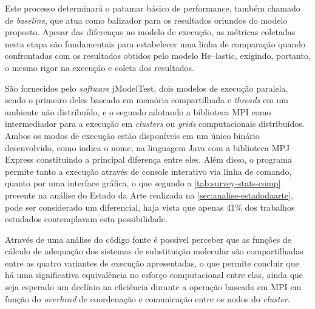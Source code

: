 \documentclass[english,brazilian]{UNISINOSmonografia} %
\begin{document}
Este processo determinará o patamar básico de performance, também chamado de \textit{baseline}, que atua como balizador para os resultados oriundos do modelo proposto.
Apesar das diferenças no modelo de execução, as métricas coletadas nesta etapa são fundamentais para estabelecer uma linha de comparação quando confrontadas com os resultados obtidos pelo modelo \textsf{He}--lastic, exigindo, portanto, o mesmo rigor na execução e coleta dos resultados.


São fornecidos pelo \textit{software} jModelTest, dois modelos de execução paralela, sendo o primeiro deles baseado em memória compartilhada e \textit{threads} em um ambiente não distribuído, e o segundo adotando a biblioteca MPI como intermediador para a execução em \textit{clusters} ou \textit{grids} computacionais distribuídos.
Ambos os modos de execução estão disponíveis em um único binário desenvolvido, como indica o nome, na linguagem Java com a biblioteca MPJ Express \cite{Baker2006} constituindo a principal diferença entre eles.
Além disso, o programa permite tanto a execução através de console interativo via linha de comando, quanto por uma interface gráfica, o que segundo a \autoref{tab:survey-stats-comp} presente na análise do Estado da Arte realizada na \autoref{sec:analise-estadodaarte}, pode ser considerado um diferencial, haja vista que apenas 41\% dos trabalhos estudados contemplavam esta possibilidade.


Através de uma análise do código fonte é possível perceber que as funções de cálculo de adequação dos sistemas de substituição molecular são compartilhadas entre as quatro variantes de execução apresentadas, o que permite concluir que há uma significativa equivalência no esforço computacional entre elas, ainda que seja esperado um declínio na eficiência durante a operação baseada em MPI em função do \textit{overhead} de coordenação e comunicação entre os nodos do \textit{cluster}.
\end{document}
